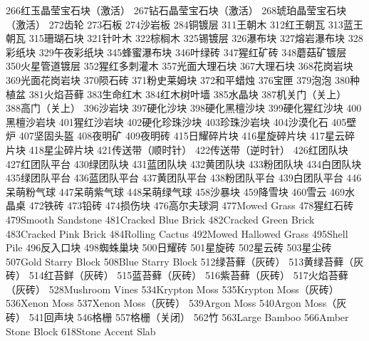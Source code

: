 {{	{266}{红玉晶莹宝石块（激活）}
	{267}{钻石晶莹宝石块（激活）}
	{268}{琥珀晶莹宝石块（激活）}
	{272}{齿轮}
	{273}{石板}
	{274}{沙岩板}
	{284}{铜镀层}
	{311}{王朝木}
	{312}{红王朝瓦}
	{313}{蓝王朝瓦}
	{315}{珊瑚石块}
	{321}{针叶木}
	{322}{棕榈木}
	{325}{锡镀层}
	{326}{瀑布块}
	{327}{熔岩瀑布块}
	{328}{彩纸块}
	{329}{午夜彩纸块}
	{345}{蜂蜜瀑布块}
	{346}{叶绿砖}
	{347}{猩红矿砖}
	{348}{蘑菇矿镀层}
	{350}{火星管道镀层}
	{352}{猩红多刺灌木}
	{357}{光面大理石块}
	{367}{大理石块}
	{368}{花岗岩块}
	{369}{光面花岗岩块}
	{370}{陨石砖}
	{371}{粉史莱姆块}
	{372}{和平蜡烛}
	{376}{宝匣}
	{379}{泡泡}
	{380}{种植盆}
	{381}{火焰苔藓}
	{383}{生命红木}
	{384}{红木树叶墙}
	{385}{水晶块}
	{387}{机关门（关上）}
	{388}{高门（关上）}
	{396}{沙岩块}
	{397}{硬化沙块}
	{398}{硬化黑檀沙块}
	{399}{硬化猩红沙块}
	{400}{黑檀沙岩块}
	{401}{猩红沙岩块}
	{402}{硬化珍珠沙块}
	{403}{珍珠沙岩块}
	{404}{沙漠化石}
	{405}{壁炉}
	{407}{坚固头盔}
	{408}{夜明矿}
	{409}{夜明砖}
	{415}{日耀碎片块}
	{416}{星旋碎片块}
	{417}{星云碎片块}
	{418}{星尘碎片块}
	{421}{传送带（顺时针）}
	{422}{传送带（逆时针）}
	{426}{红团队块}
	{427}{红团队平台}
	{430}{绿团队块}
	{431}{蓝团队块}
	{432}{黄团队块}
	{433}{粉团队块}
	{434}{白团队块}
	{435}{绿团队平台}
	{436}{蓝团队平台}
	{437}{黄团队平台}
	{438}{粉团队平台}
	{439}{白团队平台}
	{446}{呆萌粉气球}
	{447}{呆萌紫气球}
	{448}{呆萌绿气球}
	{458}{沙暴块}
	{459}{降雪块}
	{460}{雪云}
	{469}{水晶桌}
	{472}{铁砖}
	{473}{铅砖}
	{474}{损伤块}
	{476}{高尔夫球洞}
	{477}{Mowed Grass}
	{478}{猩红石砖}
	{479}{Smooth Sandstone}
	{481}{Cracked Blue Brick}
	{482}{Cracked Green Brick}
	{483}{Cracked Pink Brick}
	{484}{Rolling Cactus}
	{492}{Mowed Hallowed Grass}
	{495}{Shell Pile}
	{496}{反入口块}
	{498}{蜘蛛巢块}
	{500}{日耀砖}
	{501}{星旋砖}
	{502}{星云砖}
	{503}{星尘砖}
	{507}{Gold Starry Block}
	{508}{Blue Starry Block}
	{512}{绿苔藓（灰砖）}
	{513}{黄绿苔藓（灰砖）}
	{514}{红苔鲜（灰砖）}
	{515}{蓝苔藓（灰砖）}
	{516}{紫苔藓（灰砖）}
	{517}{火焰苔藓（灰砖）}
	{528}{Mushroom Vines}
	{534}{Krypton Moss}
	{535}{Krypton Moss（灰砖）}
	{536}{Xenon Moss}
	{537}{Xenon Moss（灰砖）}
	{539}{Argon Moss}
	{540}{Argon Moss（灰砖）}
	{541}{回声块}
	{546}{格栅}
	{557}{格栅（关闭）}
	{562}{竹}
	{563}{Large Bamboo}
	{566}{Amber Stone Block}
	{618}{Stone Accent Slab}
}}

\newcommand{\tzone}[1]{\IfEqCase{#1}{
	{dungeon}{\hyperref[app37]{地牢环境}}
	{cavern}{\hyperref[app45]{洞穴层}}
	{corruption}{\hyperref[app37]{腐化环境}}
	{crimson}{\hyperref[app37]{猩红环境}}
	{graveyard}{\hyperref[app37]{墓地环境}}
	{meteor}{\hyperref[app37]{陨石环境}}
	{oldonearmy}{\hyperref[app46]{撒旦军团环境}}
	{pillar}{\hyperref[app46]{天界柱环境}}
	{space}{\hyperref[app45]{太空层}}
	{surface}{\hyperref[app45]{地表层}}
	{underground}{\hyperref[app45]{地下层}}
	{underworld}{\hyperref[app45]{地狱层}}
	{watercandle}{\hyperref[app37]{水蜡烛环境}}
}}

